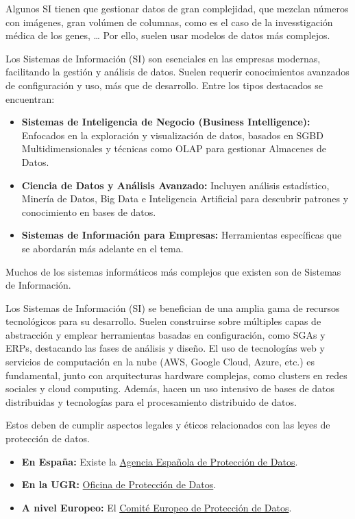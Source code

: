 \documentclass[12pt]{report} %
\providecommand{\tightlist}{%
  \setlength{\itemsep}{0pt}\setlength{\parskip}{0pt}}
\begin{document}
Algunos SI tienen que gestionar datos de gran complejidad, que mezclan
números con imágenes, gran volúmen de columnas, como es el caso de la
invesstigación médica de los genes, \ldots{} Por ello, suelen usar
modelos de datos más complejos.

Los Sistemas de Información (SI) son esenciales en las empresas
modernas, facilitando la gestión y análisis de datos. Suelen requerir
conocimientos avanzados de configuración y uso, más que de desarrollo.
Entre los tipos destacados se encuentran:

\begin{itemize}
\tightlist
\item
  \textbf{Sistemas de Inteligencia de Negocio (Business Intelligence):}
  Enfocados en la exploración y visualización de datos, basados en SGBD
  Multidimensionales y técnicas como OLAP para gestionar Almacenes de
  Datos.
\item
  \textbf{Ciencia de Datos y Análisis Avanzado:} Incluyen análisis
  estadístico, Minería de Datos, Big Data e Inteligencia Artificial para
  descubrir patrones y conocimiento en bases de datos.
\item
  \textbf{Sistemas de Información para Empresas:} Herramientas
  específicas que se abordarán más adelante en el tema.
\end{itemize}

Muchos de los sistemas informáticos más complejos que existen son de
Sistemas de Información.

Los Sistemas de Información (SI) se benefician de una amplia gama de
recursos tecnológicos para su desarrollo. Suelen construirse sobre
múltiples capas de abstracción y emplear herramientas basadas en
configuración, como SGAs y ERPs, destacando las fases de análisis y
diseño. El uso de tecnologías web y servicios de computación en la nube
(AWS, Google Cloud, Azure, etc.) es fundamental, junto con arquitecturas
hardware complejas, como clusters en redes sociales y cloud computing.
Además, hacen un uso intensivo de bases de datos distribuidas y
tecnologías para el procesamiento distribuido de datos.

Estos deben de cumplir aspectos legales y éticos relacionados con las
leyes de protección de datos.

\begin{itemize}
\tightlist
\item
  \textbf{En España:} Existe la \href{https://www.aepd.es/es}{Agencia
  Española de Protección de Datos}.
\item
  \textbf{En la UGR:}
  \href{https://secretariageneral.ugr.es/unidades/oficina-proteccion-datos}{Oficina
  de Protección de Datos}.
\item
  \textbf{A nivel Europeo:} El
  \href{https://edpb.europa.eu/edpb_es}{Comité Europeo de Protección de
  Datos}.
\end{itemize}
\end{document}
